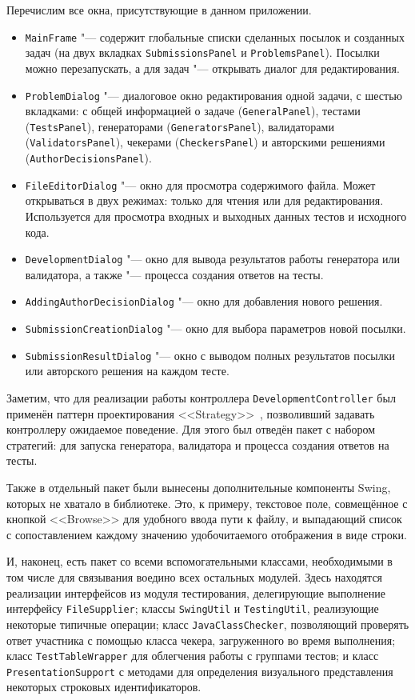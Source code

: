 Перечислим все окна, присутствующие в данном приложении.

\begin{itemize}
\item \texttt{MainFrame} "--- содержит глобальные списки сделанных посылок и созданных задач (на двух вкладках \texttt{Submissions\-Panel} и \texttt{Problems\-Panel}). Посылки можно перезапускать, а для задач "--- открывать диалог для редактирования. 
\item \texttt{ProblemDialog} "--- диалоговое окно редактирования одной задачи, с шестью вкладками: с общей информацией о задаче (\texttt{General\-Panel}), тестами (\texttt{Tests\-Panel}), генераторами (\texttt{Generators\-Panel}), валидаторами (\texttt{Validators\-Panel}), чекерами (\texttt{Checkers\-Panel}) и авторскими решениями (\texttt{Author\-Decisions\-Panel}).
\item \texttt{FileEditorDialog} "--- окно для просмотра содержимого файла. Может открываться в двух режимах: только для чтения или для редактирования. Используется для просмотра входных и выходных данных тестов и исходного кода.
\item \texttt{DevelopmentDialog} "--- окно для вывода результатов работы генератора или валидатора, а также "--- процесса создания ответов на тесты.
\item \texttt{AddingAuthorDecisionDialog} "--- окно для добавления нового решения.
\item \texttt{SubmissionCreationDialog} "--- окно для выбора параметров новой посылки.
\item \texttt{SubmissionResultDialog} "--- окно с выводом полных результатов посылки или авторского решения на каждом тесте.
\end{itemize}

Заметим, что для реализации работы контроллера \texttt{Development\-Controller} был применён паттерн проектирования <<Strategy>>~\cite{gamma}, позволивший задавать контроллеру ожидаемое поведение. Для этого был отведён пакет с набором стратегий: для запуска генератора, валидатора и процесса создания ответов на тесты.

Также в отдельный пакет были вынесены дополнительные компоненты Swing, которых не хватало в библиотеке. Это, к примеру, текстовое поле, совмещённое с кнопкой <<Browse>> для удобного ввода пути к файлу, и выпадающий список с сопоставлением каждому значению удобочитаемого отображения в виде строки.

И, наконец, есть пакет со всеми вспомогательными классами, необходимыми в том числе для связывания воедино всех остальных модулей. Здесь находятся реализации интерфейсов из модуля тестирования, делегирующие выполнение интерфейсу \texttt{File\-Supplier}; классы \texttt{Swing\-Util} и \texttt{Testing\-Util}, реализующие некоторые типичные операции; класс \texttt{Java\-Class\-Checker}, позволяющий проверять ответ участника с помощью класса чекера, загруженного во время выполнения; класс \texttt{Test\-Table\-Wrapper} для облегчения работы с группами тестов; и класс \texttt{Presentation\-Support} с методами для определения визуального представления некоторых строковых идентификаторов.